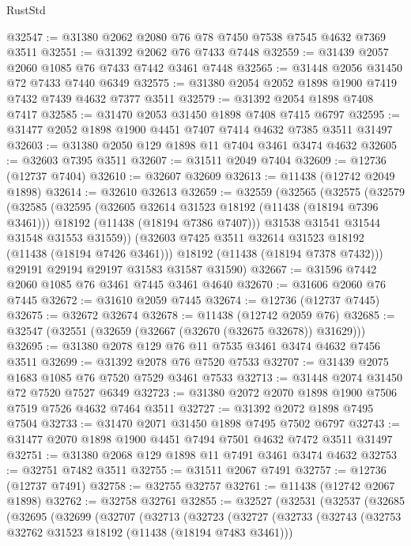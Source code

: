 \begin{lexlean}{RustStd}
\begin{coremodule}
@32547 := @31380 @2062 @2080 @76 @78 @7450 @7538 @7545 @4632 @7369 @3511
@32551 := @31392 @2062 @76 @7433 @7448
@32559 := @31439 @2057 @2060 @1085 @76 @7433 @7442 @3461 @7448
@32565 := @31448 @2056 @31450 @72 @7433 @7440 @6349
@32575 := @31380 @2054 @2052 @1898 @1900 @7419 @7432 @7439 @4632 @7377 @3511
@32579 := @31392 @2054 @1898 @7408 @7417
@32585 := @31470 @2053 @31450 @1898 @7408 @7415 @6797
@32595 := @31477 @2052 @1898 @1900 @4451 @7407 @7414 @4632 @7385 @3511 @31497
@32603 := @31380 @2050 @129 @1898 @11 @7404 @3461 @3474 @4632
@32605 := @32603 @7395 @3511
@32607 := @31511 @2049 @7404
@32609 := @12736 (@12737 @7404)
@32610 := @32607 @32609
@32613 := @11438 (@12742 @2049 @1898)
@32614 := @32610 @32613
@32659 := @32559
    (@32565
      (@32575
        (@32579
          (@32585
            (@32595
              (@32605 @32614 @31523 @18192 (@11438 (@18194 @7396 @3461)))
              @18192
              (@11438 (@18194 @7386 @7407)))
            @31538
            @31541
            @31544
            @31548
            @31553
            @31559))
        (@32603 @7425 @3511 @32614 @31523 @18192 (@11438 (@18194 @7426 @3461)))
        @18192
        (@11438 (@18194 @7378 @7432)))
      @29191
      @29194
      @29197
      @31583
      @31587
      @31590)
@32667 := @31596 @7442 @2060 @1085 @76 @3461 @7445 @3461 @4640
@32670 := @31606 @2060 @76 @7445
@32672 := @31610 @2059 @7445
@32674 := @12736 (@12737 @7445)
@32675 := @32672 @32674
@32678 := @11438 (@12742 @2059 @76)
@32685 := @32547 (@32551 (@32659 (@32667 (@32670 (@32675 @32678)) @31629)))
@32695 := @31380 @2078 @129 @76 @11 @7535 @3461 @3474 @4632 @7456 @3511
@32699 := @31392 @2078 @76 @7520 @7533
@32707 := @31439 @2075 @1683 @1085 @76 @7520 @7529 @3461 @7533
@32713 := @31448 @2074 @31450 @72 @7520 @7527 @6349
@32723 := @31380 @2072 @2070 @1898 @1900 @7506 @7519 @7526 @4632 @7464 @3511
@32727 := @31392 @2072 @1898 @7495 @7504
@32733 := @31470 @2071 @31450 @1898 @7495 @7502 @6797
@32743 := @31477 @2070 @1898 @1900 @4451 @7494 @7501 @4632 @7472 @3511 @31497
@32751 := @31380 @2068 @129 @1898 @11 @7491 @3461 @3474 @4632
@32753 := @32751 @7482 @3511
@32755 := @31511 @2067 @7491
@32757 := @12736 (@12737 @7491)
@32758 := @32755 @32757
@32761 := @11438 (@12742 @2067 @1898)
@32762 := @32758 @32761
@32855 := @32527
    (@32531
      (@32537
        (@32685
          (@32695
            (@32699
              (@32707
                (@32713
                  (@32723
                    (@32727
                      (@32733
                        (@32743
                          (@32753 @32762 @31523 @18192 (@11438 (@18194 @7483 @3461)))

\end{coremodule}
\end{lexlean}
